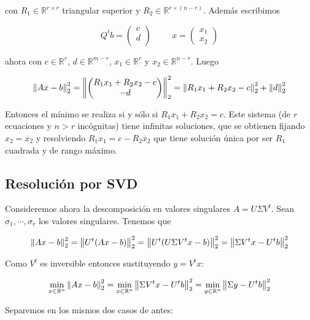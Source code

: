 \begin{itemize}
con $R_1 \in \mathbb{R}^{r \times r}$ triangular superior y $R_2 \in \mathbb{R}^{r \times (n - r)}$. Además escribimos

\[Q^tb = \begin{pmatrix}
c 	\\
d	\\
\end{pmatrix} \hspace{1cm}
x = \begin{pmatrix}
x_1 \\
x_2
\end{pmatrix}
\]

ahora con $c \in \mathbb{R}^r$, $d \in \mathbb{R}^{m - r}$, $x_1 \in \mathbb{R}^r$ y $x_2 \in \mathbb{R}^{n - r}$. Luego

\[\left\lVert Ax - b\right\rVert_2^2 = \left\lVert\begin{pmatrix}
R_1 x_1 + R_2 x_2 - c\\
-d
\end{pmatrix}\right\rVert_2^2 =
\left\lVert R_1 x_1 + R_2 x_2 - c\right\rVert_2^2 + \left\lVert d\right\rVert_2^2
\]

Entonces el mínimo se realiza si y sólo si $R_1 x_1 + R_2 x_2 = c$. Este sistema (de $r$ ecuaciones y $n > r$ incógnitas) tiene infinitas soluciones, que se obtienen fijando $x_2 = \overline{x}_2$ y resolviendo $R_1 x_1 = c - R_2 \overline{x}_2$ que tiene solución única por ser $R_1$ cuadrada y de rango máximo.

\end{itemize}

\subsection{Resolución por SVD}

Consideremos ahora la descomposición en valores singulares $A = U \Sigma V^t$. Sean $\sigma_1, \cdots, \sigma_r$ los valores singulares. Tenemos que

\[\left\lVert Ax - b\right\rVert_2^2 = \left\lVert U^t(Ax - b)\right\rVert_2^2 = \left\lVert U^t(U\Sigma V^tx - b)\right\rVert_2^2 = \left\lVert\Sigma V^t x - U^t b\right\rVert_2^2\]

Como $V^t$ es inversible entonces sustituyendo $y = V^tx$:

\[\min\limits_{x \in \mathbb{R}^n} \left\lVert Ax - b\right\rVert_2^2 = \min\limits_{x \in \mathbb{R}^n} \left\lVert\Sigma V^t x - U^t b\right\rVert_2^2  = \min \limits_{y \in \mathbb{R}^n} \left\lVert\Sigma y - U^tb\right\rVert_2^2\]

Separemos en los mismos dos casos de antes:


